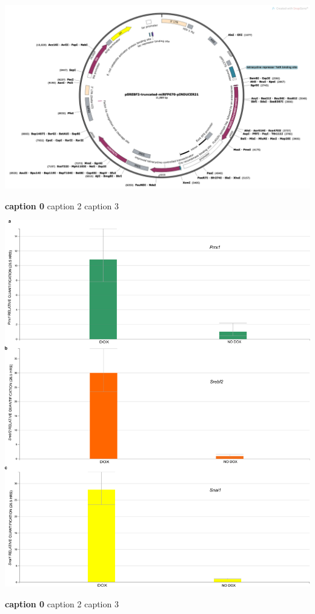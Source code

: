 \begin{suppfigure}[p]  
    \centering
    \includegraphics[width=\linewidth]{figures/hedgehog/SuppFigure14.png}
    \caption[caption1]{
        \textbf{caption 0}
        caption 2
        caption 3   
    }
    \label{fig:hh_figureS14}
\end{suppfigure}


\begin{suppfigure}[p]  
    \centering
    \includegraphics[width=\linewidth]{figures/hedgehog/SuppFigure15.png}
    \caption[caption1]{
        \textbf{caption 0}
        caption 2
        caption 3   
    }
    \label{fig:hh_figureS15}
\end{suppfigure}



